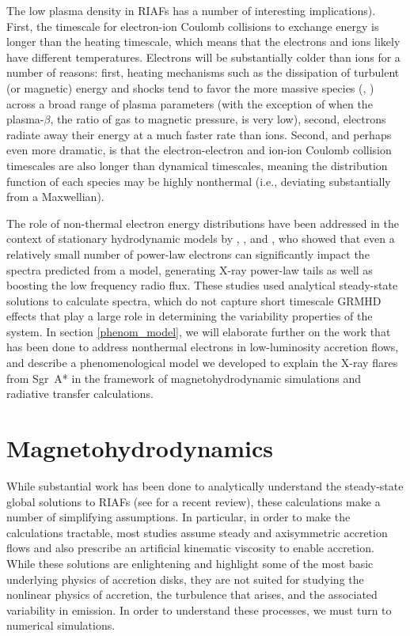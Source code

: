 The low plasma density in RIAFs has a number of interesting implications).  First, the timescale for electron-ion Coulomb collisions to exchange energy is longer than the heating timescale, which means that the electrons and ions likely have different temperatures.  Electrons will be substantially colder than ions for a number of reasons: first, heating mechanisms such as the dissipation of turbulent (or magnetic) energy and shocks tend to favor the more massive species (\citealt{howes2010}, \citealt{rowan2017}) across a broad range of plasma parameters (with the exception of when the plasma-$\beta$, the ratio of gas to magnetic pressure, is very low), second, electrons radiate away their energy at a much faster rate than ions.  Second, and perhaps even more dramatic, is that the electron-electron and ion-ion Coulomb collision timescales are also  longer than dynamical timescales, meaning the distribution function of each species may be highly nonthermal (i.e., deviating substantially from a Maxwellian).

The role of non-thermal electron energy distributions have been addressed in the context of stationary hydrodynamic models by \citet{mahadevan1998}, \citet{ozel2000}, and \citet{yuan2003}, who showed that even a relatively small number of power-law electrons can significantly impact the spectra predicted from a model, generating X-ray power-law tails as well as boosting the low frequency radio flux.  These studies used analytical steady-state solutions to calculate spectra, which do not capture short timescale GRMHD effects that play a large role in determining the variability properties of the system.  In section \ref{phenom_model}, we will elaborate further on the work that has been done to address nonthermal electrons in low-luminosity accretion flows, and describe a phenomenological model we developed to explain the X-ray flares from Sgr~A* in the framework of magnetohydrodynamic simulations and radiative transfer calculations.

\label{sec_lowlum}
\section{Magnetohydrodynamics}
While substantial work has been done to analytically understand the steady-state global solutions to RIAFs (see \citealt{yuan2014} for a recent review), these calculations make a number of simplifying assumptions.  In particular, in order to make the calculations tractable, most studies assume steady and axisymmetric accretion flows and also prescribe an artificial kinematic viscosity to enable accretion.  While these solutions are enlightening and highlight some of the most basic underlying physics of accretion disks, they are not suited for studying the nonlinear physics of accretion, the turbulence that arises, and the associated variability in emission.  In order to understand these processes, we must turn to numerical simulations.

